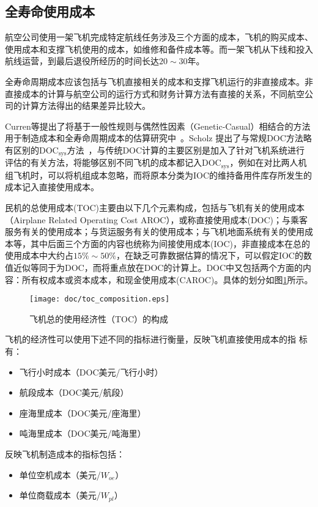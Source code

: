 \subsection{全寿命使用成本}

航空公司使用一架飞机完成特定航线任务涉及三个方面的成本，飞机的购买成本、使用成本和支撑飞机使用的成本，如维修和备件成本等。而一架飞机从下线和投入航线运营，到最后退役所经历的时间长达$20\sim30$年。

全寿命周期成本应该包括与飞机直接相关的成本和支撑飞机运行的非直接成本。非直接成本的计算与航空公司的运行方式和财务计算方法有直接的关系，不同航空公司的计算方法得出的结果差异比较大。

Curren等提出了将基于一般性规则与偶然性因素（Genetic-Casual）相结合的方法用于制造成本和全寿命周期成本的估算研究中~\cite{curren05}。Scholz 提出了与常规DOC方法略有区别的DOC$_{\textrm{sys}}$方法~\cite{scholz}，与传统DOC计算的主要区别是加入了针对飞机系统进行评估的有关方法，将能够区别不同飞机的成本都记入DOC$_{\textrm{sys}}$，例如在对比两人机组飞机时，可以将机组成本忽略，而将原本分类为IOC的维持备用件库存所发生的成本记入直接使用成本。

民机的总使用成本(TOC)主要由以下几个元素构成，包括与飞机有关的使用成本（Airplane Related Operating Cost AROC），或称直接使用成本(DOC)；与乘客服务有关的使用成本；与货运服务有关的使用成本；与飞机地面系统有关的使用成本等，其中后面三个方面的内容也统称为间接使用成本(IOC)，非直接成本在总的使用成本中大约占$15\%\sim50\%$，在缺乏可靠数据估算的情况下，可以假定IOC的数值近似等同于为DOC，而将重点放在DOC的计算上。DOC中又包括两个方面的内容：所有权成本或资本成本，和现金使用成本(CAROC)。具体的划分如图\ref{fig_toc}所示。
\begin{figure}
\begin{center}
  \texttt{[image: doc/toc\_composition.eps]}
  \caption{飞机总的使用经济性（TOC）的构成}
  \label{fig_toc}
\end{center}
\end{figure}

飞机的经济性可以使用下述不同的指标进行衡量，反映飞机直接使用成本的指
标有：
\begin{itemize}
\item[(1)]飞行小时成本（DOC美元/飞行小时）
\item[(2)]航段成本（DOC美元/航段）
\item[(3)]座海里成本（DOC美元/座海里）
\item[(4)]吨海里成本（DOC美元/吨海里）
\end{itemize}
反映飞机制造成本的指标包括：
\begin{itemize}
\item[(1)]单位空机成本（美元/$W_{oe}$）
\item[(2)]单位商载成本（美元/$W_{pl}$）
\end{itemize}

